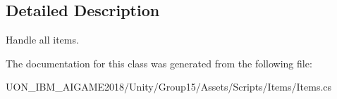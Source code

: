 \subsection{Detailed Description}
Handle all items. 

The documentation for this class was generated from the following file\+:\begin{DoxyCompactItemize}
\item 
U\+O\+N\+\_\+\+I\+B\+M\+\_\+\+A\+I\+G\+A\+M\+E2018/\+Unity/\+Group15/\+Assets/\+Scripts/\+Items/Items.\+cs\end{DoxyCompactItemize}
